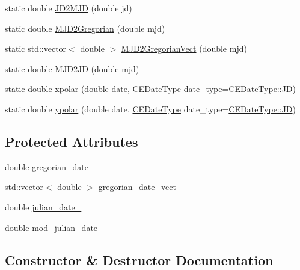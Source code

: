 \begin{DoxyCompactItemize}
static double \hyperlink{class_c_e_date_a2f8aa5a0023c485407ce172c167d970d}{J\+D2\+M\+J\+D} (double jd)
\item 
static double \hyperlink{class_c_e_date_a3c33bc8e95c975087dab29645839794c}{M\+J\+D2\+Gregorian} (double mjd)
\item 
static std\+::vector$<$ double $>$ \hyperlink{class_c_e_date_a6e0489eaa084ffa934f2a661929e74cf}{M\+J\+D2\+Gregorian\+Vect} (double mjd)
\item 
static double \hyperlink{class_c_e_date_ad5610b1c2d2891dff856f5be07801272}{M\+J\+D2\+J\+D} (double mjd)
\item 
static double \hyperlink{class_c_e_date_ace399234c2715e61518393497511b293}{xpolar} (double date, \hyperlink{_c_e_date_8h_aa6b826beca26b0712061a4afc5ad7746}{C\+E\+Date\+Type} date\+\_\+type=\hyperlink{_c_e_date_8h_aa6b826beca26b0712061a4afc5ad7746aabf8d7515962e526421842e8456798cc}{C\+E\+Date\+Type\+::\+J\+D})
\item 
static double \hyperlink{class_c_e_date_a013d72a2273b76be18978a79c4d96166}{ypolar} (double date, \hyperlink{_c_e_date_8h_aa6b826beca26b0712061a4afc5ad7746}{C\+E\+Date\+Type} date\+\_\+type=\hyperlink{_c_e_date_8h_aa6b826beca26b0712061a4afc5ad7746aabf8d7515962e526421842e8456798cc}{C\+E\+Date\+Type\+::\+J\+D})
\end{DoxyCompactItemize}
\subsection*{Protected Attributes}
\begin{DoxyCompactItemize}
\item 
double \hyperlink{class_c_e_date_aecd5239b5cf81e46525ee24c6bf2b48e}{gregorian\+\_\+date\+\_\+}
\item 
std\+::vector$<$ double $>$ \hyperlink{class_c_e_date_a3f2468a5ab3c5e58a5da6b2800d88165}{gregorian\+\_\+date\+\_\+vect\+\_\+}
\item 
double \hyperlink{class_c_e_date_a58170c23976d025cd631d42b10b8930c}{julian\+\_\+date\+\_\+}
\item 
double \hyperlink{class_c_e_date_aa713ba7b4c88ce0d453d18fb756cc645}{mod\+\_\+julian\+\_\+date\+\_\+}
\end{DoxyCompactItemize}


\subsection{Constructor \& Destructor Documentation}
\hypertarget{class_c_e_date_a26bb1483e185a10594e82aa622499367}{}
